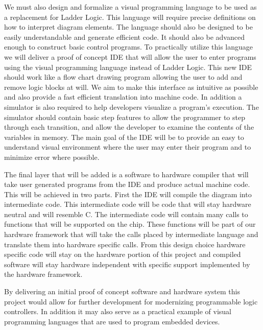 We must also design and formalize a visual programming language to be used as a replacement for Ladder Logic. This language will require precise definitions on how to interpret diagram elements. The language should also be designed to be easily understandable and generate efficient code. It should also be advanced enough to construct basic control programs. To practically utilize this language we will deliver a proof of concept IDE that will allow the user to enter programs using the visual programming language instead of Ladder Logic. This new IDE should work like a flow chart drawing program allowing the user to add and remove logic blocks at will. We aim to make this interface as intuitive as possible and also provide a fast efficient translation into machine code. In addition a simulator is also required to help developers visualize a program's execution. The simulator should contain basic step features to allow the programmer to step through each transition, and allow the developer to examine the contents of the variables in memory. The main goal of the IDE will be to provide an easy to understand visual environment where the user may enter their program and to minimize error where possible.

The final layer that will be added is a software to hardware compiler that will take user generated programs from the IDE and produce actual machine code. This will be achieved in two parts. First the IDE will compile the diagram into intermediate code. This intermediate code will be code that will stay hardware neutral and will resemble C. The intermediate code will contain many calls to functions that will be supported on the chip. These functions will be part of our hardware framework that will take the calls placed by intermediate language and translate them into hardware specific calls. From this design choice hardware specific code will stay on the hardware portion of this project and compiled software will stay hardware independent with specific support implemented by the hardware framework.

By delivering an initial proof of concept software and hardware system this project would allow for further development for modernizing programmable logic controllers. In addition it may also serve as a practical example of visual programming languages that are used to program embedded devices.
